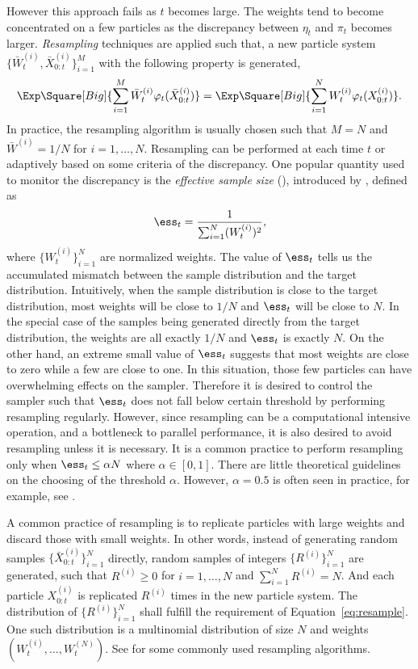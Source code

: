 \documentclass[11pt, fontset=Minion, showoverfull,
bib, mintcode, minted=cache]{marticle}
\begin{document}
However this approach fails as $t$ becomes large. The weights tend to become
concentrated on a few particles as the discrepancy between $\eta_t$ and
$\pi_t$ becomes larger. \emph{Resampling} techniques are applied such that, a
new particle system $\{\bar{W}_t^{(i)},\bar{X}_{0:t}^{(i)}\}_{i=1}^M$ with the
following property is generated,
\begin{equation}
  \Exp\Square[Big]{\sum_{i=1}^M\bar{W}_t^{(i)}\varphi_t(\bar{X}_{0:t}^{(i)})}
  = \Exp\Square[Big]{\sum_{i=1}^NW_t^{(i)}\varphi_t(X_{0:t}^{(i)})}.
  \label{eq:resample}
\end{equation}
In practice, the resampling algorithm is usually chosen such that $M = N$ and
$\bar{W}^{(i)} = 1/N$ for $i=1,\dots,N$. Resampling can be performed at each
time $t$ or adaptively based on some criteria of the discrepancy. One popular
quantity used to monitor the discrepancy is the \emph{effective sample size}
(\ess), introduced by \textcite{Liu:1998iu}, defined as
\begin{equation}
  \ess_t = \frac{1}{\sum_{i=1}^N (W_t^{(i)})^2},
\end{equation}
where $\{W_t^{(i)}\}_{i=1}^N$ are normalized weights. The value of $\ess_t$
tells us the accumulated mismatch between the sample distribution and the
target distribution. Intuitively, when the sample distribution is close to the
target distribution, most weights will be close to $1/N$ and $\ess_t$ will be
close to $N$. In the special case of the samples being generated directly from
the target distribution, the weights are all exactly $1/N$ and $\ess_t$ is
exactly $N$. On the other hand, an extreme small value of $\ess_t$ suggests
that most weights are close to zero while a few are close to one. In this
situation, those few particles can have overwhelming effects on the sampler.
Therefore it is desired to control the sampler such that $\ess_t$ does not
fall below certain threshold by performing resampling regularly. However,
since resampling can be a computational intensive operation, and a bottleneck
to parallel performance, it is also desired to avoid resampling unless it is
necessary. It is a common practice to perform resampling only when $\ess_t\le
\alpha N$ where $\alpha\in[0,1]$. There are little theoretical guidelines on
the choosing of the threshold $\alpha$. However, $\alpha = 0.5$ is often seen
in practice, for example, see \textcite{Jasra:2010eh}.

A common practice of resampling is to replicate particles with large weights
and discard those with small weights. In other words, instead of generating
random samples $\{\bar{X}_{0:t}^{(i)}\}_{i=1}^N$ directly, random samples of
integers $\{R^{(i)}\}_{i=1}^N$ are generated, such that $R^{(i)} \ge 0$ for $i
= 1,\dots,N$ and $\sum_{i=1}^N R^{(i)} = N$. And each particle $X_{0:t}^{(i)}$
is replicated $R^{(i)}$ times in the new particle system. The distribution of
$\{R^{(i)}\}_{i=1}^N$ shall fulfill the requirement of
Equation~\ref{eq:resample}. One such distribution is a multinomial
distribution of size $N$ and weights $(W_t^{(i)},\dots,W_t^{(N)})$. See
\textcite{Douc:2005wa} for some commonly used resampling algorithms.
\end{document}
